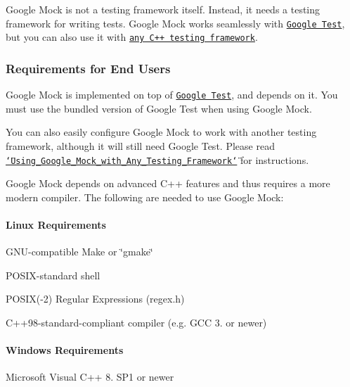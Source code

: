 Google Mock is not a testing framework itself. Instead, it needs a testing framework for writing tests. Google Mock works seamlessly with \href{https://github.com/google/googletest}{\tt Google Test}, but you can also use it with \href{../googlemock/docs/ForDummies.md#using-google-mock-with-any-testing-framework}{\tt any C++ testing framework}.

\subsubsection*{Requirements for End Users}

Google Mock is implemented on top of \href{http://github.com/google/googletest/}{\tt Google Test}, and depends on it. You must use the bundled version of Google Test when using Google Mock.

You can also easily configure Google Mock to work with another testing framework, although it will still need Google Test. Please read \href{../googlemock/docs/ForDummies.md#using-google-mock-with-any-testing-framework}{\tt \char`\"{}\+Using\+\_\+\+Google\+\_\+\+Mock\+\_\+with\+\_\+\+Any\+\_\+\+Testing\+\_\+\+Framework\char`\"{}} for instructions.

Google Mock depends on advanced C++ features and thus requires a more modern compiler. The following are needed to use Google Mock\+:

\paragraph*{Linux Requirements}


\begin{DoxyItemize}
\item G\+N\+U-\/compatible Make or \char`\"{}gmake\char`\"{}
\item P\+O\+S\+I\+X-\/standard shell
\item P\+O\+S\+IX(-\/2) Regular Expressions (regex.\+h)
\item C++98-\/standard-\/compliant compiler (e.\+g. G\+CC 3. or newer)
\end{DoxyItemize}

\paragraph*{Windows Requirements}


\begin{DoxyItemize}
\item Microsoft Visual C++ 8. S\+P1 or newer
\end{DoxyItemize}


